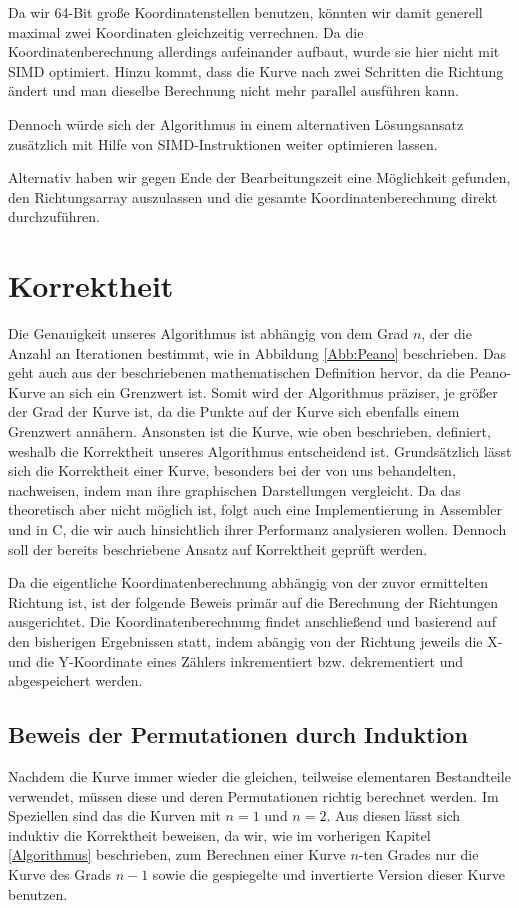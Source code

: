 \documentclass[course=asp]{aspdoc}
\begin{document}
Da wir 64-Bit gro\ss e Koordinatenstellen benutzen, k\"onnten wir damit generell maximal zwei Koordinaten gleichzeitig verrechnen. Da die Koordinatenberechnung allerdings aufeinander aufbaut, wurde sie hier nicht mit SIMD optimiert. Hinzu kommt, dass die Kurve nach zwei Schritten die Richtung \"andert und man dieselbe Berechnung nicht mehr parallel ausf\"uhren kann.

Dennoch w\"urde sich der Algorithmus in einem alternativen L\"osungsansatz zus\"atzlich mit Hilfe von SIMD-Instruktionen weiter optimieren lassen.  

Alternativ haben wir gegen Ende der Bearbeitungszeit eine M\"oglichkeit gefunden, den Richtungsarray auszulassen und die gesamte Koordinatenberechnung direkt durchzuf\"uhren.

\section{Korrektheit} \label{Korrektheit} %

Die Genauigkeit unseres Algorithmus ist abh\"angig von dem Grad $n$, der die Anzahl an Iterationen bestimmt, wie in Abbildung \ref{Abb:Peano} beschrieben. Das geht auch aus der beschriebenen mathematischen Definition hervor, da die Peano-Kurve an sich ein Grenzwert ist. Somit wird der Algorithmus pr\"aziser, je gr\"o\ss er der Grad der Kurve ist, da die Punkte auf der Kurve sich ebenfalls einem Grenzwert ann\"ahern. Ansonsten ist die Kurve, wie oben beschrieben, definiert, weshalb die Korrektheit unseres Algorithmus entscheidend ist.
Grunds\"atzlich l\"asst sich die Korrektheit einer Kurve, besonders bei der von uns behandelten, nachweisen, indem man ihre graphischen Darstellungen vergleicht. Da das theoretisch aber nicht m\"oglich ist, folgt auch eine Implementierung in Assembler und in C, die wir auch hinsichtlich ihrer Performanz analysieren wollen.
Dennoch soll der bereits beschriebene Ansatz auf Korrektheit gepr\"uft werden.

Da die eigentliche Koordinatenberechnung abh\"angig von der zuvor ermittelten Richtung ist, ist der folgende Beweis prim\"ar auf die Berechnung der Richtungen ausgerichtet.
Die Koordinatenberechnung findet anschlie\ss end und basierend auf den bisherigen Ergebnissen statt, indem ab\"angig von der Richtung jeweils die X- und die Y-Koordinate eines Z\"ahlers inkrementiert bzw. dekrementiert und abgespeichert werden.

\subsection{Beweis der Permutationen durch Induktion} \label{Beweis der Permutationen durch Induktion}
Nachdem die Kurve immer wieder die gleichen, teilweise elementaren Bestandteile verwendet, m\"ussen diese und deren Permutationen richtig berechnet werden. Im Speziellen sind das die Kurven mit $n = 1$ und $n = 2$. Aus diesen l\"asst sich induktiv die Korrektheit beweisen, da wir, wie im vorherigen Kapitel \ref{Algorithmus} beschrieben, zum Berechnen einer Kurve $n$-ten Grades nur die Kurve des Grads $n - 1$ sowie die gespiegelte und invertierte Version dieser Kurve benutzen.
\end{document}
